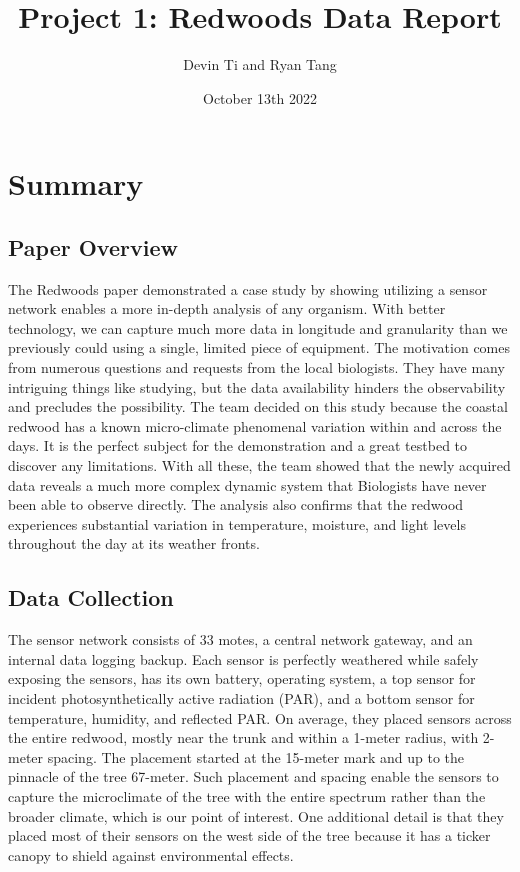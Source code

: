 \documentclass[11pt, letterpaper]{article}
\title{Project 1: Redwoods Data Report}
\author{Devin Ti and Ryan Tang}
\date{October 13th 2022}
\begin{document}
\maketitle

\section{Summary}
\subsection{Paper Overview}
The Redwoods paper demonstrated a case study by showing utilizing a sensor network enables a 
more in-depth analysis of any organism. With better technology, we can capture much more data in longitude and granularity than we previously could using a single, limited piece of equipment.
The motivation comes from numerous questions and requests from the local biologists. They have many intriguing things like studying, but the data availability hinders the observability and precludes
the possibility. The team decided on this study because the coastal redwood has a known micro-climate phenomenal variation within and across the days. It is the perfect subject for the demonstration and a great testbed to discover any limitations. With all these, the team showed that the newly acquired data reveals a much more complex dynamic system that Biologists have never been able to observe directly. The analysis also confirms that the redwood experiences substantial variation in temperature, moisture, and light levels throughout the day at its weather fronts.

\subsection{Data Collection}
The sensor network consists of 33 motes, a central network gateway, and an internal data logging backup. Each sensor is perfectly weathered while safely exposing the sensors, has its own battery, operating system, a top sensor for incident photosynthetically active radiation (PAR), and a bottom sensor for temperature, humidity, and reflected PAR. On average, they placed sensors across the entire redwood, mostly near the trunk and within a 1-meter radius, with 2-meter spacing. The placement started at the 15-meter mark and up to the pinnacle of the tree 67-meter. Such placement and spacing enable the sensors to capture the microclimate of the tree with the entire spectrum rather than the broader climate, which is our point of interest. One additional detail is that they placed most of their sensors on the west side of the tree because it has a ticker canopy to shield against environmental effects.
\end{document}
